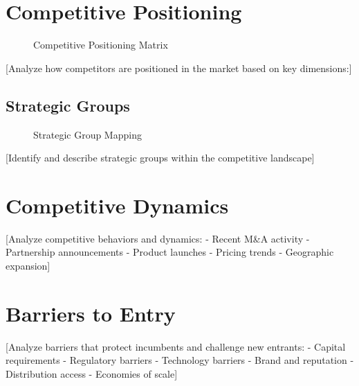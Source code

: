 \documentclass[11pt,letterpaper]{report}
\begin{document}
\section{Competitive Positioning}


\begin{figure}[htbp]
\centering
\caption{Competitive Positioning Matrix}
\label{fig:competitive_positioning}
\end{figure}

[Analyze how competitors are positioned in the market based on key dimensions:]

\subsection{Strategic Groups}


\begin{figure}[htbp]
\centering
\caption{Strategic Group Mapping}
\label{fig:strategic_groups}
\end{figure}

[Identify and describe strategic groups within the competitive landscape]

\section{Competitive Dynamics}

[Analyze competitive behaviors and dynamics:
- Recent M\&A activity
- Partnership announcements
- Product launches
- Pricing trends
- Geographic expansion]

\section{Barriers to Entry}

[Analyze barriers that protect incumbents and challenge new entrants:
- Capital requirements
- Regulatory barriers
- Technology barriers
- Brand and reputation
- Distribution access
- Economies of scale]

\end{document}

